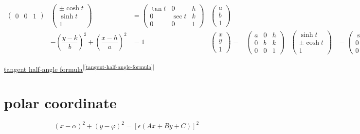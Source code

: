 \documentclass[
]{book}
\theoremstyle{definition}
\theoremstyle{definition}
\theoremstyle{definition}
\theoremstyle{definition}
\theoremstyle{remark}
\begin{document}
\[\begin{array}{cccccccc}
\begin{pmatrix}
0 & 0 & 1
\end{pmatrix} & \begin{pmatrix}\pm\cosh t\\
\sinh t\\
1
\end{pmatrix} & =\begin{pmatrix}\tan t & 0 & h\\
0 & \sec t & k\\
0 & 0 & 1
\end{pmatrix} & \begin{pmatrix}a\\
b\\
1
\end{pmatrix}\\
 & -\left(\dfrac{y-k}{b}\right)^{2}+\left(\dfrac{x-h}{a}\right)^{2} & =1 & \begin{pmatrix}x\\
y\\
1
\end{pmatrix}= & \begin{pmatrix}a & 0 & h\\
0 & b & k\\
0 & 0 & 1
\end{pmatrix} & \begin{pmatrix}\sinh t\\
\pm\cosh t\\
1
\end{pmatrix} & =\begin{pmatrix}\sec t & 0 & h\\
0 & \tan t & k\\
0 & 0 & 1
\end{pmatrix} & \begin{pmatrix}a\\
b\\
1
\end{pmatrix}
\end{array}
\]

\protect\hyperlink{tangent-half-angle-formula}{tangent half-angle formula}\textsuperscript{{[}\ref{tangent-half-angle-formula}{]}}

\hypertarget{polar-coordinate-1}{%
\section{polar coordinate}\label{polar-coordinate-1}}

\[
\left(x-\alpha\right)^{2}+\left(y-\varphi\right)^{2}=\left[\epsilon\left(Ax+By+C\right)\right]^{2}
\]
\end{document}
